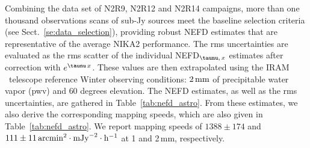 Combining the data set of N2R9, N2R12 and N2R14 campaigns, more than one
thousand observations scans of sub-Jy sources meet the baseline selection
criteria (see Sect.~\ref{se:data_selection}), providing robust NEFD estimates
that are representative of the average NIKA2 performance. The rms
uncertainties are evaluated as the rms scatter of the individual
NEFD$_{\taunu,\, x}$ estimates after correction with
$e^{\taunu\,x}$. 
These values are then extrapolated using the IRAM
\trentemetre\ telescope reference Winter observing conditions: $2\,\rm{mm}$ of
precipitable water vapor (pwv) and $60$ degrees elevation. The NEFD
estimates, as well as the rms uncertainties, are gathered in
Table~\ref{tab:nefd_astro}.
From these estimates, we also derive the corresponding mapping speeds,
which are also given in Table~\ref{tab:nefd_astro}.
We report mapping speeds of $1388 \pm 174$ and
$111 \pm 11 \, \rm{arcmin}^2\cdot \rm{mJy}^{-2}\cdot \rm{h}^{-1}$ at 1
and 2\,mm, respectively. 


